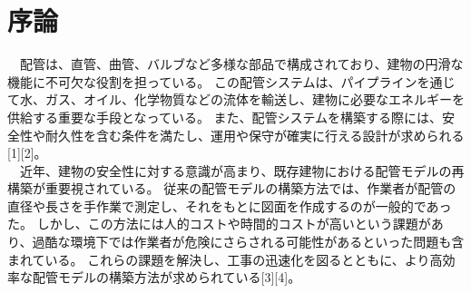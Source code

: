 \chapter{序論}
　配管は、直管、曲管、バルブなど多様な部品で構成されており、建物の円滑な機能に不可欠な役割を担っている。
この配管システムは、パイプラインを通じて水、ガス、オイル、化学物質などの流体を輸送し、建物に必要なエネルギーを供給する重要な手段となっている。
また、配管システムを構築する際には、安全性や耐久性を含む条件を満たし、運用や保守が確実に行える設計が求められる[1][2]。\\
　近年、建物の安全性に対する意識が高まり、既存建物における配管モデルの再構築が重要視されている。
従来の配管モデルの構築方法では、作業者が配管の直径や長さを手作業で測定し、それをもとに図面を作成するのが一般的であった。
しかし、この方法には人的コストや時間的コストが高いという課題があり、過酷な環境下では作業者が危険にさらされる可能性があるといった問題も含まれている。
これらの課題を解決し、工事の迅速化を図るとともに、より高効率な配管モデルの構築方法が求められている[3][4]。

